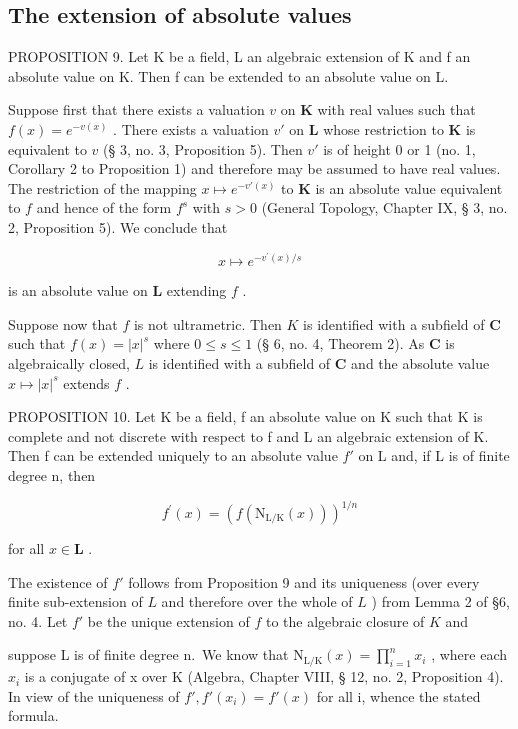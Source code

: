 \subsection{The extension of absolute values}

PROPOSITION 9. Let K be a field, L an algebraic extension of K and f an absolute value on K. Then f can be extended to an absolute value on L.

Suppose first that there exists a valuation \(v\) on \(\mathbf{K}\) with real values such that \(f(x) = e^{-v(x)}\) . There exists a valuation \(v'\) on \(\mathbf{L}\) whose restriction to \(\mathbf{K}\) is equivalent to \(v\) (§ 3, no. 3, Proposition 5). Then \(v'\) is of height 0 or 1 (no. 1, Corollary 2 to Proposition 1) and therefore may be assumed to have real values. The restriction of the mapping \(x \mapsto e^{-v'(x)}\) to \(\mathbf{K}\) is an absolute value equivalent to \(f\) and hence of the form \(f^s\) with \(s > 0\) (General Topology, Chapter IX, § 3, no. 2, Proposition 5). We conclude that

\[
x \mapsto e ^ {- v ^ {\prime} (x) / s}
\]

is an absolute value on \(\mathbf{L}\) extending \(f\) .

Suppose now that \(f\) is not ultrametric. Then \(K\) is identified with a subfield of \(\mathbf{C}\) such that \(f(x) = |x|^s\) where \(0 \leqslant s \leqslant 1\) (§ 6, no. 4, Theorem 2). As \(\mathbf{C}\) is algebraically closed, \(L\) is identified with a subfield of \(\mathbf{C}\) and the absolute value \(x \mapsto |x|^s\) extends \(f\) .

PROPOSITION 10. Let K be a field, f an absolute value on K such that K is complete and not discrete with respect to f and L an algebraic extension of K. Then f can be extended uniquely to an absolute value \(f'\) on L and, if L is of finite degree n, then

\[
f ^ {\prime} (x) = \left(f (\mathrm{N} _ {\mathrm{L/K}} (x))\right) ^ {1 / n}
\]

for all \(x \in \mathbf{L}\) .

The existence of \(f'\) follows from Proposition 9 and its uniqueness (over every finite sub-extension of \(L\) and therefore over the whole of \(L\) ) from Lemma 2 of §6, no. 4. Let \(f'\) be the unique extension of \(f\) to the algebraic closure of \(K\) and

suppose L is of finite degree n.~We know that \(\mathrm{N}_{\mathrm{L}/\mathrm{K}}(x)=\prod_{i=1}^{n} x_i\) , where each \(x_{i}\) is a conjugate of x over K (Algebra, Chapter VIII, § 12, no. 2, Proposition 4). In view of the uniqueness of \(f', f'(x_{i})=f'(x)\) for all i, whence the stated formula.

